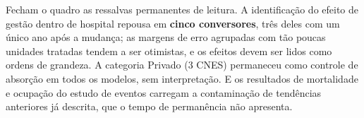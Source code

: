 %
%
Fecham o quadro as ressalvas permanentes de leitura. A identificação
do efeito de gestão dentro de hospital repousa em \textbf{cinco
conversores}, três deles com um único ano após a mudança; as margens
de erro agrupadas com tão poucas unidades tratadas tendem a ser
otimistas, e os efeitos devem ser lidos como ordens de grandeza. A
categoria Privado (3 CNES) permaneceu como controle de absorção em
todos os modelos, sem interpretação. E os resultados de mortalidade e
ocupação do estudo de eventos carregam a contaminação de tendências
anteriores já descrita, que o tempo de permanência não apresenta.
